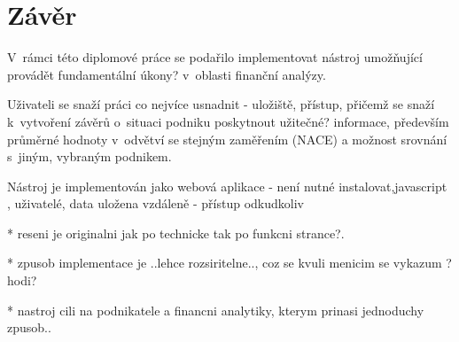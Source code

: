 \chapter{Závěr}
V~rámci této diplomové práce se podařilo implementovat nástroj umožňující provádět fundamentální úkony? v~oblasti finanční analýzy.

Uživateli se snaží práci co nejvíce usnadnit - uložiště, přístup, přičemž se snaží k~vytvoření závěrů o~situaci podniku poskytnout užitečné? informace, především průměrné hodnoty v~odvětví se stejným zaměřením (NACE) a možnost srovnání s~jiným, vybraným podnikem.

Nástroj je implementován jako webová aplikace - není nutné instalovat,javascript , uživatelé, data uložena vzdáleně - přístup odkudkoliv

* reseni je originalni jak po technicke tak po funkcni strance?. 

* zpusob implementace je ..lehce rozsiritelne.., coz se kvuli menicim se vykazum ?hodi?

* nastroj cili na podnikatele a financni analytiky, kterym prinasi jednoduchy zpusob..

